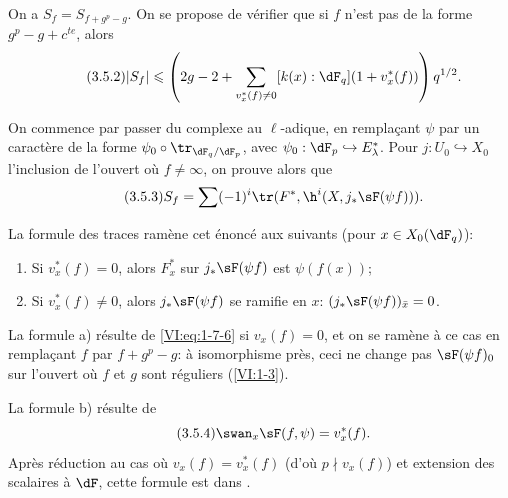 On a $S_f=S_{f+g^p-g}$. On se propose de vérifier que si $f$ n'est pas de la 
forme $g^p-g+c^{t e}$, alors 
\begin{equation*}\tag{3.5.2}\label{VI:eq:3-5-2}
  |S_f|\leqslant \left(2 g-2+\sum_{v_x^\ast(f)\ne 0} [k(x):\dF_q] (1+v_x^\ast(f))\right) q^{1/2} \text{.}
\end{equation*}

On commence par passer du complexe au $\ell$-adique, en remplaçant $\psi$ par 
un caractère de la forme $\psi_0\circ \tr_{\dF_q/\dF_p}$, avec 
$\psi_0:\dF_p\hookrightarrow E_\lambda^\ast$. Pour $j:U_0\hookrightarrow X_0$ 
l'inclusion de l'ouvert où $f\ne\infty$, on prouve alors que 
\begin{equation*}\tag{3.5.3}\label{VI:eq:3-5-3}
  S_f = \sum (-1)^i \tr(F^\ast,\h^i(X,j_\ast \sF(\psi f))) \text{.} 
\end{equation*}

La formule des traces ramène cet énoncé aux suivants (pour 
$x\in X_0(\dF_q)$): 
\begin{enumerate}[\indent a)]
  \item Si $v_x^\ast(f)=0$, alors $F_x^\ast$ sur $j_\ast \sF(\psi f)$ est 
    $\psi(f(x))$; 
  \item Si $v_x^\ast(f)\ne 0$, alors $j_\ast \sF(\psi f)$ se ramifie en $x$: 
    $(j_\ast \sF(\psi f))_{\bar x}=0$. 
\end{enumerate}

La formule a) résulte de \eqref{VI:eq:1-7-6} si $v_x(f)=0$, et on se ramène 
à ce cas en remplaçant $f$ par $f+g^p-g$: à isomorphisme près, ceci ne 
change pas $\sF(\psi f)_0$ sur l'ouvert où $f$ et $g$ sont réguliers 
(\ref{VI:1-3}). 

La formule b) résulte de 
\begin{equation*}\tag{3.5.4}\label{VI:eq:3-5-4}
  \swan_x \sF(f,\psi) = v_x^\ast(f) \text{.} 
\end{equation*}
Après réduction au cas où $v_x(f)=v_x^\ast(f)$ (d'où $p\nmid v_x(f)$) 
et extension des scalaires à $\dF$, cette formule est dans 
. 

